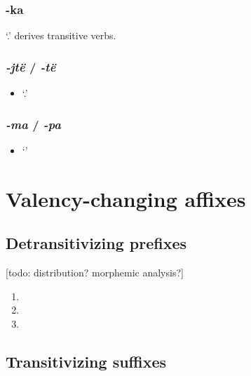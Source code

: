 \documentclass{memoir}
\begin{document}
\subsubsection{\texorpdfstring{-ka \label{sec:kavbz}}{-ka }}

 `.' derives transitive verbs.

\subsubsection{\texorpdfstring{\emph{-jtë} / \emph{-të}
\label{sec:jtevbz}}{-jtë / -të }}

\begin{itemize}
\tightlist
\item
   `.'
\end{itemize}

\subsubsection{\texorpdfstring{\emph{-ma} / \emph{-pa}
\label{sec:macaus}}{-ma / -pa }}

\begin{itemize}
\tightlist
\item
   `'
\end{itemize}

\section{Valency-changing affixes}

\subsection{\texorpdfstring{Detransitivizing prefixes
\label{sec:detrz}}{Detransitivizing prefixes }}

{[}todo: distribution? morphemic analysis?{]}

\begin{enumerate}
\def\labelenumi{\arabic{enumi}.}
\item
\item
\item
\end{enumerate}

\subsection{Transitivizing suffixes}
\end{document}

